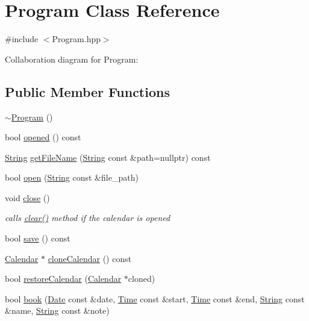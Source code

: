 \hypertarget{classProgram}{}\section{Program Class Reference}
\label{classProgram}


{\ttfamily \#include $<$Program.\+hpp$>$}



Collaboration diagram for Program\+:
\subsection*{Public Member Functions}
\begin{DoxyCompactItemize}
\item 
\hyperlink{classProgram_a986aef1c50e1d338a3315a47ba6df549}{$\sim$\+Program} ()
\item 
bool \hyperlink{classProgram_a2f494b9e0a50657ac89a61a96e92face}{opened} () const
\item 
\hyperlink{classString}{String} \hyperlink{classProgram_a78c686e8f768666e0377b23317134b4a}{get\+File\+Name} (\hyperlink{classString}{String} const \&path=nullptr) const
\item 
bool \hyperlink{classProgram_a4658796d44178138e3c50df2346f20c9}{open} (\hyperlink{classString}{String} const \&file\+\_\+path)
\item 
void \hyperlink{classProgram_ab8b7a28d1be3f1b8c5136e936c75ca63}{close} ()
\begin{DoxyCompactList}\small\item\em calls \hyperlink{classProgram_a6fd6135c7adf5af67b55a2303d95defe}{clear()} method if the calendar is opened \end{DoxyCompactList}\item 
bool \hyperlink{classProgram_a9ab390cc3caa8cc7dee9704a273a6979}{save} () const
\item 
\hyperlink{classCalendar}{Calendar} $\ast$ \hyperlink{classProgram_ae2bc41544b2cedf95611867ead89d6c9}{clone\+Calendar} () const
\item 
bool \hyperlink{classProgram_a0c4c553237a075bc9ab5d4c6b80b4471}{restore\+Calendar} (\hyperlink{classCalendar}{Calendar} $\ast$cloned)
\item 
bool \hyperlink{classProgram_a3fd5b4cf3d1eaa58809f593ccdc7a2d3}{book} (\hyperlink{classDate}{Date} const \&date, \hyperlink{classTime}{Time} const \&start, \hyperlink{classTime}{Time} const \&end, \hyperlink{classString}{String} const \&name, \hyperlink{classString}{String} const \&note)

\end{DoxyCompactItemize}
